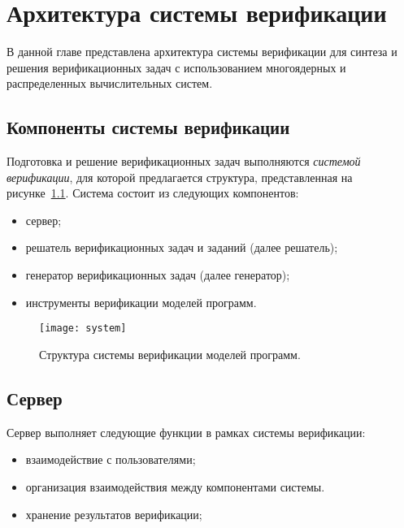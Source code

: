 \chapter{Архитектура системы верификации}
В данной главе представлена архитектура системы верификации для синтеза и решения верификационных задач с использованием многоядерных и распределенных вычислительных систем.

\section{Компоненты системы верификации}
Подготовка и решение верификационных задач выполняются \textit{системой верификации}, для которой предлагается структура, представленная на рисунке~\ref{figure:system}. 
Система состоит из следующих компонентов:
\begin{itemize}
    \item сервер;
    \item решатель верификационных задач и заданий (далее решатель);
    \item генератор верификационных задач (далее генератор);
    \item инструменты верификации моделей программ.
\end{itemize}

\begin{figure}
\centering
\texttt{[image: system]}
\caption{Структура системы верификации моделей программ.}
\label{figure:system}
\end{figure}

\section{Сервер}
Сервер выполняет следующие функции в рамках системы верификации:
\begin{itemize}
\item взаимодействие с пользователями;
\item организация взаимодействия между компонентами системы.
\item хранение результатов верификации; 
\end{itemize}

